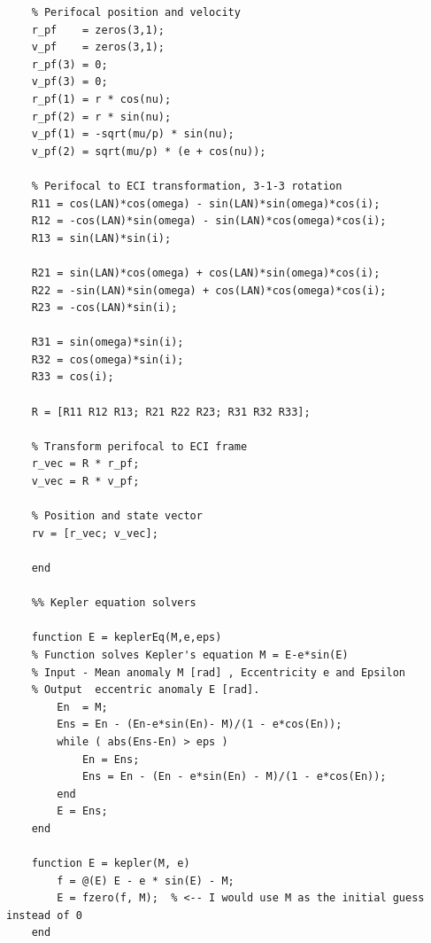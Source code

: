 \documentclass[conf]{new-aiaa}
\begin{document}
\begin{lstlisting}
	% Perifocal position and velocity 
	r_pf    = zeros(3,1);  
	v_pf    = zeros(3,1); 
	r_pf(3) = 0; 
	v_pf(3) = 0; 
	r_pf(1) = r * cos(nu); 
	r_pf(2) = r * sin(nu); 
	v_pf(1) = -sqrt(mu/p) * sin(nu); 
	v_pf(2) = sqrt(mu/p) * (e + cos(nu)); 

	% Perifocal to ECI transformation, 3-1-3 rotation 
	R11 = cos(LAN)*cos(omega) - sin(LAN)*sin(omega)*cos(i); 
	R12 = -cos(LAN)*sin(omega) - sin(LAN)*cos(omega)*cos(i); 
	R13 = sin(LAN)*sin(i); 

	R21 = sin(LAN)*cos(omega) + cos(LAN)*sin(omega)*cos(i); 
	R22 = -sin(LAN)*sin(omega) + cos(LAN)*cos(omega)*cos(i); 
	R23 = -cos(LAN)*sin(i); 

	R31 = sin(omega)*sin(i); 
	R32 = cos(omega)*sin(i); 
	R33 = cos(i); 

	R = [R11 R12 R13; R21 R22 R23; R31 R32 R33]; 

	% Transform perifocal to ECI frame 
	r_vec = R * r_pf; 
	v_vec = R * v_pf; 

	% Position and state vector 
	rv = [r_vec; v_vec]; 

	end 

	%% Kepler equation solvers 

	function E = keplerEq(M,e,eps)
	% Function solves Kepler's equation M = E-e*sin(E)
	% Input - Mean anomaly M [rad] , Eccentricity e and Epsilon 
	% Output  eccentric anomaly E [rad]. 
		En  = M;
		Ens = En - (En-e*sin(En)- M)/(1 - e*cos(En));
		while ( abs(Ens-En) > eps )
			En = Ens;
			Ens = En - (En - e*sin(En) - M)/(1 - e*cos(En));
		end
		E = Ens;
	end

	function E = kepler(M, e)
		f = @(E) E - e * sin(E) - M;
		E = fzero(f, M);  % <-- I would use M as the initial guess instead of 0
	end
	
	
	
	
	
	
	
	
	
	
	
	
\end{lstlisting}






% 
\end{document}

